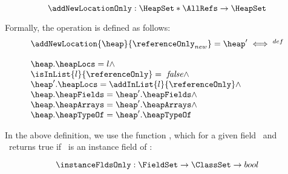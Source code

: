  $$ \addNewLocationOnly : \HeapSet *  \AllRefs   \rightarrow \HeapSet $$

 Formally, the operation is defined as follows: 
 $$ \begin{array}{l}
           \addNewLocation{\heap}{\referenceOnly_{new}} = \heap' \iff^{def} \\
	      \\
              \heap.\heapLocs = l \wedge \\
   	      \isInList{l}{\referenceOnly} = \mbox{ \rm \textit{false}} \wedge \\
	      \heap'.\heapLocs = \addInList{l}{\referenceOnly}  \wedge \\ 
	      \heap.\heapFields = \heap'.\heapFields \wedge \\
	      \heap.\heapArrays = \heap'.\heapArrays \wedge \\
	      \heap.\heapTypeOf = \heap'.\heapTypeOf
    \end{array}$$ 

In the above definition, we use the function \instanceFldsOnly, which for a given field \fieldd \ and \clazz \ returns true if \fieldd \ is
an instance field of \clazz: 

$$
 \instanceFldsOnly : \FieldSet   \rightarrow \ClassSet \rightarrow bool 
$$

